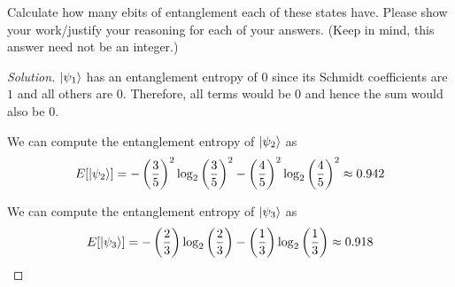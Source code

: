 \begin{solution}[label=ques:4b]
  \begin{question}
    Calculate how many ebits of entanglement each of these states have. Please show your work/justify your reasoning for each of your answers. (Keep in mind, this answer need not be an integer.)
  \end{question}
  \tcblower{}
  \begin{proof}[Solution]
    $\ket{\psi_1}$ has an entanglement entropy of $0$ since its Schmidt coefficients are $1$ and all others are $0$. Therefore, all terms would be $0$ and hence the sum would also be $0$.\par\bigskip
    We can compute the entanglement entropy of $\ket{\psi_2}$ as
    \begin{equation}
      E[\ket{\psi_2}] = -\left(\frac{3}{5}\right)^2\log_2\left(\frac{3}{5}\right)^2 - \left(\frac{4}{5}\right)^2\log_2\left(\frac{4}{5}\right)^2 \approx 0.942
      \label{eq:ee2}
    \end{equation}\par\bigskip
    We can compute the entanglement entropy of $\ket{\psi_3}$ as
    \begin{equation}
      E[\ket{\psi_3}] = -\left(\frac{2}{3}\right)\log_2\left(\frac{2}{3}\right) - \left(\frac{1}{3}\right)\log_2\left(\frac{1}{3}\right) \approx 0.918
      \label{eq:ee3}
    \end{equation}
  \end{proof}
\end{solution}

